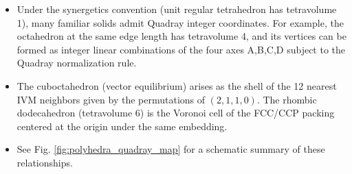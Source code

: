 \documentclass[
]{article}
\providecommand{\tightlist}{%
  \setlength{\itemsep}{0pt}\setlength{\parskip}{0pt}}
\begin{document}
\begin{itemize}
\tightlist
\item
  Under the synergetics convention (unit regular tetrahedron has
  tetravolume 1), many familiar solids admit Quadray integer
  coordinates. For example, the octahedron at the same edge length has
  tetravolume 4, and its vertices can be formed as integer linear
  combinations of the four axes A,B,C,D subject to the Quadray
  normalization rule.
\item
  The cuboctahedron (vector equilibrium) arises as the shell of the 12
  nearest IVM neighbors given by the permutations of \((2,1,1,0)\). The
  rhombic dodecahedron (tetravolume 6) is the Voronoi cell of the
  FCC/CCP packing centered at the origin under the same embedding.
\item
  See Fig. \ref{fig:polyhedra_quadray_map} for a schematic summary of
  these relationships.
\end{itemize}
\end{document}
